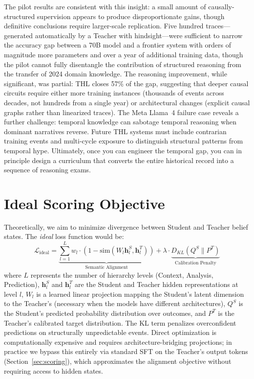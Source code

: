 \documentclass[11pt,a4paper]{article}
\begin{document}
The pilot results are consistent with this insight: a small amount of causally-structured supervision appears to produce disproportionate gains, though definitive conclusions require larger-scale replication. Five hundred traces---generated automatically by a Teacher with hindsight---were sufficient to narrow the accuracy gap between a 70B model and a frontier system with orders of magnitude more parameters and over a year of additional training data, though the pilot cannot fully disentangle the contribution of structured reasoning from the transfer of 2024 domain knowledge. The reasoning improvement, while significant, was partial: THL closes 57\% of the gap, suggesting that deeper causal circuits require either more training instances (thousands of events across decades, not hundreds from a single year) or architectural changes (explicit causal graphs rather than linearized traces). The Meta Llama~4 failure case reveals a further challenge: temporal knowledge can sabotage temporal reasoning when dominant narratives reverse. Future THL systems must include contrarian training events and multi-cycle exposure to distinguish structural patterns from temporal hype. Ultimately, once you can engineer the temporal gap, you can in principle design a curriculum that converts the entire historical record into a sequence of reasoning exams.

\appendix

\section{Ideal Scoring Objective}
\label{app:ideal_objective}

Theoretically, we aim to minimize divergence between Student and Teacher belief states. The \textit{ideal} loss function would be:
\begin{equation}
    \mathcal{L}_{\text{ideal}} = \underbrace{\sum_{l=1}^{L} w_l \cdot (1 - \text{sim}(W_l \mathbf{h}_l^{S}, \mathbf{h}_l^{T}))}_{\text{Semantic Alignment}} + \lambda \cdot \underbrace{D_{KL}(Q^S \| P^T)}_{\text{Calibration Penalty}}
    \label{eq:ideal}
\end{equation}
where $L$ represents the number of hierarchy levels (Context, Analysis, Prediction), $\mathbf{h}_l^{S}$ and $\mathbf{h}_l^{T}$ are the Student and Teacher hidden representations at level $l$, $W_l$ is a learned linear projection mapping the Student's latent dimension to the Teacher's (necessary when the models have different architectures), $Q^S$ is the Student's predicted probability distribution over outcomes, and $P^T$ is the Teacher's calibrated target distribution. The KL term penalizes overconfident predictions on structurally unpredictable events. Direct optimization is computationally expensive and requires architecture-bridging projections; in practice we bypass this entirely via standard SFT on the Teacher's output tokens (Section~\ref{sec:scoring}), which approximates the alignment objective without requiring access to hidden states.
\end{document}
